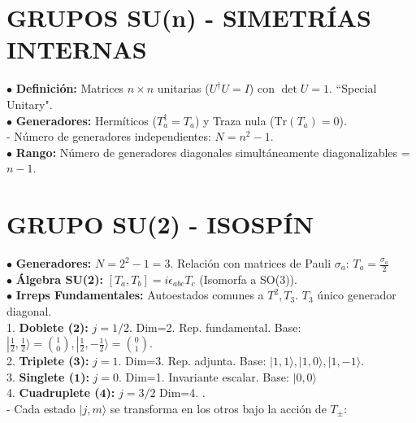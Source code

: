 \section{GRUPOS SU(n) - SIMETRÍAS INTERNAS}
$\bullet$ \textbf{Definición:} Matrices $n\times n$ unitarias ($U^\dagger U = I$) con $\det U = 1$. ``Special Unitary".\\
$\bullet$ \textbf{Generadores:}  Hermíticos ($T_a^\dagger = T_a$) y Traza nula ($\text{Tr}(T_a)=0$).\\
- Número de generadores independientes: $N=n^2 - 1$.\\
$\bullet$ \textbf{Rango:} Número de generadores diagonales simultáneamente diagonalizables = $n-1$.

\section{GRUPO SU(2) - ISOSPÍN}
$\bullet$ \textbf{Generadores:} $N = 2^2 - 1 = 3$. Relación con matrices de Pauli $\sigma_a$: $ T_a = \frac{\sigma_a}{2}$\\
$\bullet$ \textbf{Álgebra SU(2):} $[T_a, T_b] = i \epsilon_{abc} T_c$ (Isomorfa a SO(3)).\\
$\bullet$ \textbf{Irreps Fundamentales:} Autoestados comunes a $T^2, T_3.$ $T_3$ único generador diagonal.\\
1. \textbf{Doblete ($\mathbf{2}$):} $j=1/2$. Dim=2. Rep. fundamental.
   Base: $|\frac{1}{2}, \frac{1}{2}\rangle = \binom{1}{0}, |\frac{1}{2}, -\frac{1}{2}\rangle = \binom{0}{1}$.\\
2. \textbf{Triplete ($\mathbf{3}$):} $j=1$. Dim=3. Rep. adjunta.
   Base: $|1,1\rangle, |1,0\rangle, |1,-1\rangle$.\\
3. \textbf{Singlete ($\mathbf{1}$):} $j=0$. Dim=1. Invariante escalar. Base: $|0, 0\rangle$\\
4. \textbf{Cuadruplete ($\mathbf{4}$):} $j=3/2$ Dim=4. .\\
- Cada estado $|j,m\rangle$ se transforma en los otros bajo la acción de $T_{\pm}$:\\
\noindent
\begin{minipage}{\linewidth}
\centering
{}
\end{minipage}
